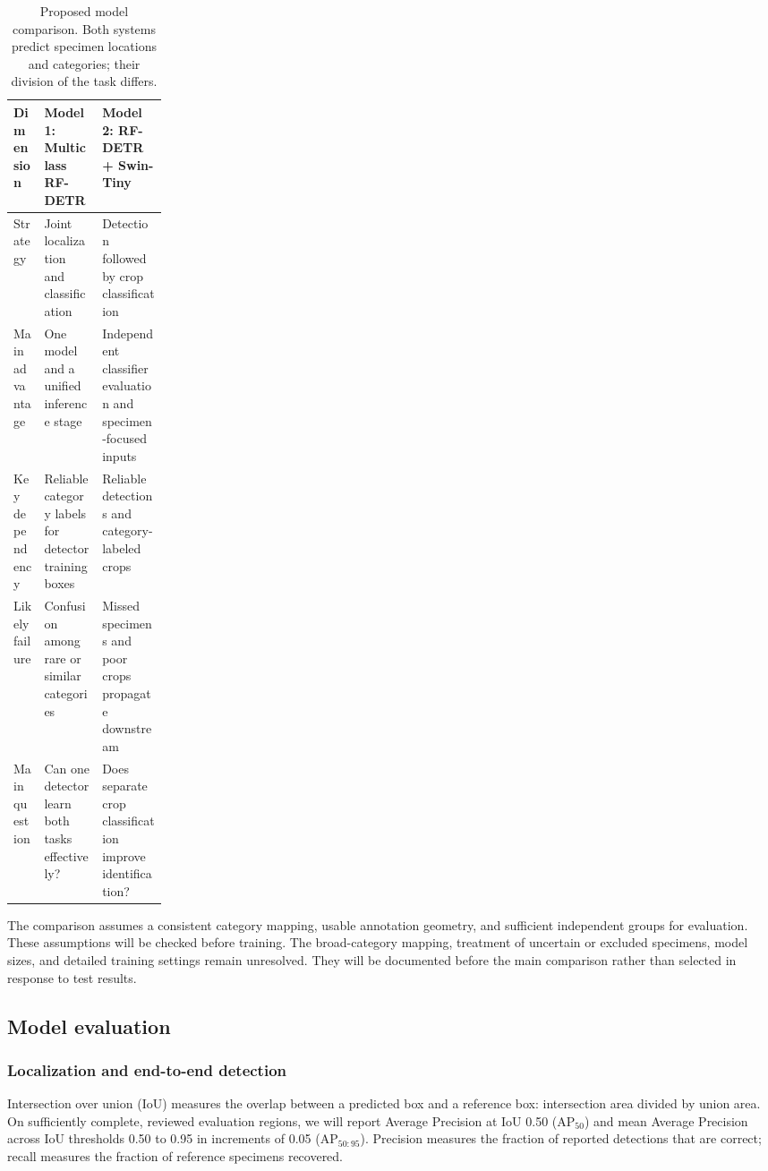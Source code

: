 \documentclass[conference,letterpaper]{IEEEtran}
\begin{document}
\begin{table}[t]
\centering
\caption{Proposed model comparison. Both systems predict specimen locations and categories; their division of the task differs.}
\label{tab:models}
\begin{tabularx}{\linewidth}{p{0.20\linewidth}YY}
\toprule
Dimension & Model 1: Multiclass RF-DETR & Model 2: RF-DETR + Swin-Tiny \\
\midrule
Strategy & Joint localization and classification & Detection followed by crop classification \\
Main advantage & One model and a unified inference stage & Independent classifier evaluation and specimen-focused inputs \\
Key dependency & Reliable category labels for detector training boxes & Reliable detections and category-labeled crops \\
Likely failure & Confusion among rare or similar categories & Missed specimens and poor crops propagate downstream \\
Main question & Can one detector learn both tasks effectively? & Does separate crop classification improve identification? \\
\bottomrule
\end{tabularx}
\end{table}

The comparison assumes a consistent category mapping, usable annotation geometry, and sufficient independent groups for evaluation. These assumptions will be checked before training. The broad-category mapping, treatment of uncertain or excluded specimens, model sizes, and detailed training settings remain unresolved. They will be documented before the main comparison rather than selected in response to test results.

\subsection{Model evaluation}
\subsubsection{Localization and end-to-end detection}
Intersection over union (IoU) measures the overlap between a predicted box and a reference box: intersection area divided by union area. On sufficiently complete, reviewed evaluation regions, we will report Average Precision at IoU 0.50 ($\mathrm{AP}_{50}$) and mean Average Precision across IoU thresholds 0.50 to 0.95 in increments of 0.05 ($\mathrm{AP}_{50:95}$). Precision measures the fraction of reported detections that are correct; recall measures the fraction of reference specimens recovered.
\end{document}
